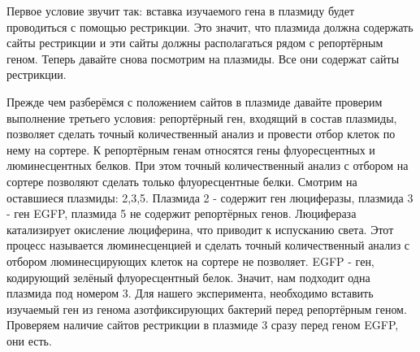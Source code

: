 Первое условие звучит так: вставка изучаемого гена в плазмиду будет проводиться с помощью рестрикции. Это значит, что плазмида должна содержать сайты рестрикции и эти сайты должны располагаться рядом с репортёрным геном. Теперь давайте снова посмотрим на плазмиды. Все они содержат сайты рестрикции. 

Прежде чем разберёмся с положением сайтов в плазмиде давайте проверим выполнение третьего условия: репортёрный ген, входящий в состав плазмиды, позволяет сделать точный количественный анализ и провести отбор клеток по нему на сортере. К репортёрным генам относятся гены флуоресцентных и люминесцентных белков. При этом точный количественный анализ с отбором на сортере позволяют сделать только флуоресцентные белки. Смотрим на оставшиеся плазмиды: 2,3,5. Плазмида 2 - содержит ген люциферазы, плазмида 3 - ген EGFP, плазмида 5 не содержит репортёрных генов. Люцифераза катализирует окисление люциферина, что приводит к испусканию света. Этот процесс называется люминесценцией и сделать точный количественный анализ с отбором люминесцирующих клеток на сортере не позволяет. EGFP - ген, кодирующий зелёный флуоресцентный белок. Значит, нам подходит одна плазмида под номером 3. Для нашего эксперимента, необходимо вставить изучаемый ген из генома азотфиксирующих бактерий перед репортёрным геном. Проверяем наличие сайтов рестрикции в плазмиде 3 сразу перед геном EGFP, они есть.

